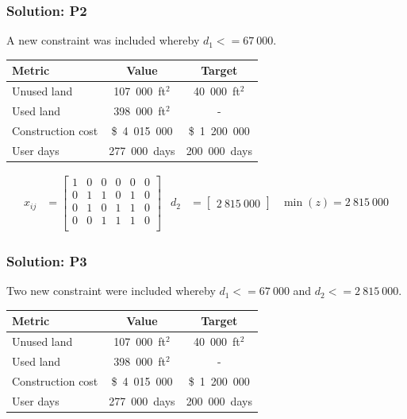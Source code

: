 \documentclass[a4paper,11pt]{article}
\begin{document}
\subsubsection{Solution: P2}
A new constraint was included whereby $d_1 <= 67\ 000$.
\begin{center}
	\begin{tabular}{l c c}
		\hline
		\hline
		\textbf{Metric} & \textbf{Value} & \textbf{Target}\\
		\hline
		\hline
		Unused land & 107\ 000\ ft$^2$ & 40\ 000\ ft$^2$\\
		Used land & 398\ 000\ ft$^2$ & -\\
		Construction cost & \$\ 4\ 015\ 000 & \$\ 1\ 200\ 000 \\
		User days & 277\ 000\ days & 200\ 000\ days\\
		\hline
	\end{tabular}
\end{center}

\begin{align}
x_{ij} &= 
	\begin{bmatrix} 
    1  &  0  &  0  &  0  &  0  &  0 \\
    0  &  1  &  1  &  0  &  1  &  0 \\
    0  &  1  &  0  &  1  &  1  &  0 \\
    0  &  0  &  1  &  1  &  1  &  0 \\
	\end{bmatrix}
&d_2 &= 	\begin{bmatrix} 
    2\ 815\ 000 \end{bmatrix} & \min(z) = 2\ 815\ 000
\end{align}

\subsubsection{Solution: P3}
Two new constraint were included whereby $d_1 <= 67\ 000$ and $d_2 <= 2\ 815\ 000$.
\begin{center}
	\begin{tabular}{l c c}
		\hline
		\hline
		\textbf{Metric} & \textbf{Value} & \textbf{Target}\\
		\hline
		\hline
		Unused land & 107\ 000\ ft$^2$ & 40\ 000\ ft$^2$\\
		Used land & 398\ 000\ ft$^2$ & -\\
		Construction cost & \$\ 4\ 015\ 000 & \$\ 1\ 200\ 000 \\
		User days & 277\ 000\ days & 200\ 000\ days\\
		\hline
	\end{tabular}
\end{center}
\end{document}
